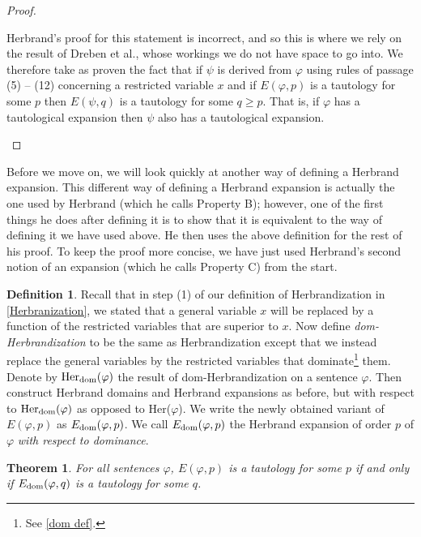 \documentclass[a4paper,12pt]{report}
\newtheorem{theo}{Theorem}
\theoremstyle{definition}
\newtheorem{mydef}[lem]{Definition}
\begin{document}
\begin{proof}
\begin{enumerate}[(i)]
\begin{enumerate}[(a)]
Herbrand's proof for this statement is incorrect, and so this is where we rely on the result of Dreben et al., whose workings we do not have space to go into. We therefore take as proven the fact that if $\psi$ is derived from $\varphi$ using rules of passage (5) -- (12) concerning a restricted variable $x$ and if $E(\varphi, p)$ is a tautology for some $p$ then $E(\psi, q)$ is a tautology for some $q \ge p$. That is, if $\varphi$ has a tautological expansion then $\psi$ also has a tautological expansion. \qedhere

\end{enumerate}
\end{enumerate}
\end{proof}

Before we move on, we will look quickly at another way of defining a Herbrand expansion. This different way of defining a Herbrand expansion is actually the one used by Herbrand (which he calls Property B); however, one of the first things he does after defining it is to show that it is equivalent to the way of defining it we have used above. He then uses the above definition for the rest of his proof. To keep the proof more concise, we have just used Herbrand's second notion of an expansion (which he calls Property C) from the start.

\begin{mydef}
Recall that in step (1) of our definition of Herbrandization in \ref{Herbranization}, we stated that a  general variable $x$ will be replaced by a function of the restricted variables that are superior to $x$. Now define \emph{dom-Herbrandization} to be the same as Herbrandization except that we instead replace the general variables by the restricted variables that dominate\footnote{See \ref{dom def}.} them. Denote by $\mbox{Her}_{\mbox{\scriptsize{dom}}}(\varphi)$ the result of dom-Herbrandization on a sentence $\varphi$. Then construct Herbrand domains and Herbrand expansions as before, but with respect to $\mbox{Her}_{\mbox{\scriptsize{dom}}}(\varphi)$ as opposed to Her($\varphi$). We write the newly obtained variant of  $E ( \varphi , p)$ as $E_{\mbox{\scriptsize{dom}}}(\varphi, p)$. We call $E_{\mbox{\scriptsize{dom}}}(\varphi, p)$ the Herbrand expansion of order $p$ of $\varphi$ \emph{with respect to dominance}.
\end{mydef}

\begin{theo}
\label{b theorem}
For all sentences $\varphi$, $E(\varphi, p)$ is a tautology for some $p$ if and only if $E_{\mbox{\scriptsize{dom}}}(\varphi, q)$ is a tautology for some $q$.
\end{theo}
\end{document}
